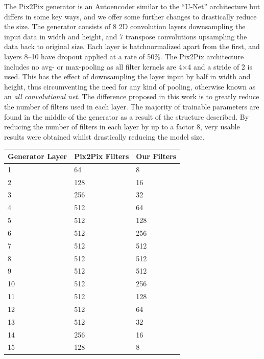 \documentclass{article}
\begin{document}
The Pix2Pix generator is an Autoencoder similar to the ``U-Net'' architecture\cite{1505.04597} but differs in some key ways, and we offer some further changes to drastically reduce the size. The generator consists of 8 2D convolution layers downsampling the input data in width and height, and 7 transpose convolutions upsampling the data back to original size. Each layer is batchnormalized\cite{1502.03167} apart from the first, and layers 8--10 have dropout\cite{JMLR:v15:srivastava14a} applied at a rate of 50\%. The Pix2Pix architecture includes no avg- or max-pooling as all filter kernels are 4$\times$4 and a stride of 2 is used. This has the effect of downsampling the layer input by half in width and height, thus circumventing the need for any kind of pooling, otherwise known as an \textit{all convolutional net}\cite{1412.6806}. The difference proposed in this work is to greatly reduce the number of filters used in each layer. The majority of trainable parameters are found in the middle of the generator as a result of the structure described. By reducing the number of filters in each layer by up to a factor 8, very usable results were obtained whilst drastically reducing the model size.

\begin{small}
	\begin{center}
		\begin{tabular}{p{2cm} p{2cm} p{2cm}}
			\toprule
			Generator Layer & Pix2Pix Filters & Our Filters \\
			\midrule
			1               & 64              & 8           \\
			2               & 128             & 16          \\
			3               & 256             & 32          \\
			4               & 512             & 64          \\
			5               & 512             & 128         \\
			6               & 512             & 256         \\
			7               & 512             & 512         \\
			8               & 512             & 512         \\
			9               & 512             & 512         \\
			10              & 512             & 256         \\
			11              & 512             & 128         \\
			12              & 512             & 64          \\
			13              & 512             & 32          \\
			14              & 256             & 16          \\
			15              & 128             & 8           \\
			\bottomrule
		\end{tabular}
	\end{center}
\end{small}
\end{document}
